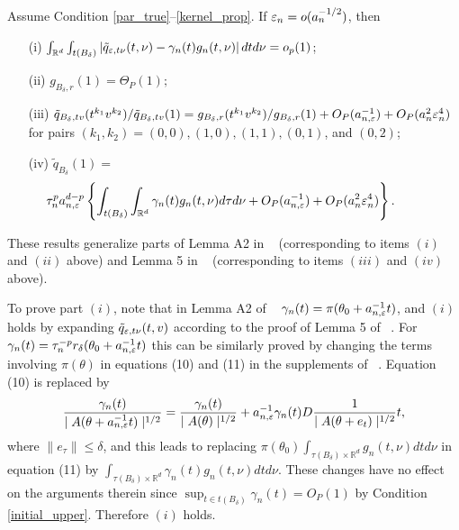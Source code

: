 \begin{lemma}\label{Alemma2} Assume Condition \ref{par_true}--\ref{kernel_prop}. If $\varepsilon_{n}=o(a_{n}^{-1/2})$, then 
	\begin{enumerate}
		\item[(i)] $\int_{\mathbb{R}^{d}}\int_{t(B_{\delta})}|\tilde{q}_{\varepsilon,t\nu}(t,\nu)-\gamma_{n}(t)g_{n}(t,\nu)|\,dtd\nu=o_{p}(1)$;
		\item[(ii)] $g_{B_{\delta},r}(1)=\Theta_{P}(1);$ 
		\item[(iii)] $\tilde{q}_{B_{\delta},tv}(t^{k_{1}}v^{k_{2}})/\tilde{q}_{B_{\delta},tv}(1)=g_{B_{\delta},r}(t^{k_{1}}v^{k_{2}})/g_{B_{\delta},r}(1)+O_{P}(a_{n,\varepsilon}^{-1})+O_{P}(a_{n}^{2}\varepsilon_{n}^{4})$
		for pairs $(k_{1}, k_{2}) = (0,0), (1,0), (1,1), (0,1)$, and $(0,2)$; 
		\item[(iv)] $\tilde{q}_{B_{\delta}}(1)=$
		\begin{eqnarray*}
		&\hspace{-1cm}\tau_{n}^{p}a_{n,\veps}^{d-p}\left\{ \int_{t(B_{\delta})}\int_{\mathbb{R}^{d}}\gamma_{n}(t)g_{n}(t,\nu)d\tau d\nu+O_{P}(a_{n,\veps}^{-1})+O_{P}(a_{n}^{2}\veps_{n}^{4})\right\} .
		\end{eqnarray*} 
	\end{enumerate}\end{lemma}
	These results generalize parts of Lemma A2 in ~\cite{Li2017} (corresponding to items $(i)$ and $(ii)$ above) and Lemma 5 in
	~\cite{Li2016} (corresponding to items $(iii)$ and $(iv)$ above). 
	
	To prove part $(i)$, note that in Lemma A2 of ~\cite{Li2017}  $\gamma_{n}(t)=\pi(\theta_0+a_{n,\varepsilon}^{-1}t)$,
	and $(i)$ holds by expanding $\tilde{q}_{\varepsilon,t\nu}(t,v)$ according to
	the proof of Lemma 5 of ~\cite{Li2016}. 
	For $\gamma_{n}(t)=\tau_{n}^{-p}r_{\delta}(\theta_0+a_{n,\varepsilon}^{-1}t)$ this can be similarly proved by changing the terms involving $\pi(\theta)$ in equations (10) and (11) in the supplements of ~\cite{Li2016}. Equation (10)
	is replaced by 
	\[
	\frac{\gamma_{n}(t)}{\mid A(\theta+a_{n,\varepsilon}^{-1}t)\mid^{1/2}}=\frac{\gamma_{n}(t)}{\mid A(\theta)\mid^{1/2}}+a_{n,\varepsilon}^{-1}\gamma_{n}(t)D\frac{1}{\mid A(\theta+e_{t})\mid^{1/2}}t,
	\]
	where $\|e_{\tau}\|\leq\delta$, and this leads to replacing $\pi(\theta_0)\int_{\tau(B_{\delta})\times\mathbb{R}^{d}}g_{n}(t,\nu)dtd\nu$
	in equation (11) by $\int_{\tau(B_{\delta})\times\mathbb{R}^{d}}\gamma_{n}(t)g_{n}(t,\nu)dtd\nu$.
	These changes have no effect on the arguments therein since $\sup_{t\in t(B_{\delta})}\gamma_{n}(t)=O_{P}(1)$
	by Condition \ref{initial_upper}. Therefore $(i)$ holds.
	
